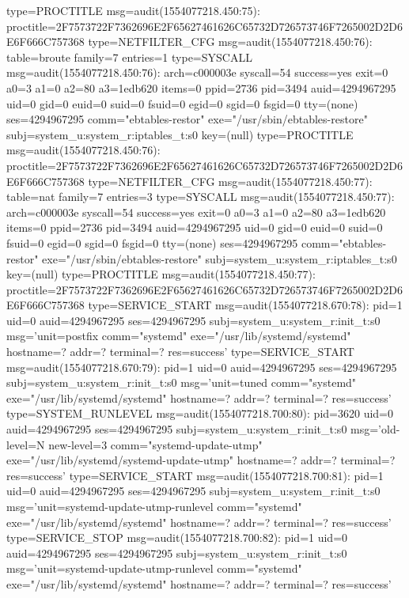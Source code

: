 \documentclass[]{report}
\newenvironment{Shaded}{}{}
\newcommand{\NormalTok}[1]{#1}
\begin{document}
\begin{Shaded}
\begin{Highlighting}[]
\NormalTok{type=PROCTITLE msg=audit(1554077218.450:75): proctitle=2F7573722F7362696E2F65627461626C65732D726573746F7265002D2D6E6F666C757368}
\NormalTok{type=NETFILTER_CFG msg=audit(1554077218.450:76): table=broute family=7 entries=1}
\NormalTok{type=SYSCALL msg=audit(1554077218.450:76): arch=c000003e syscall=54 success=yes exit=0 a0=3 a1=0 a2=80 a3=1edb620 items=0 ppid=2736 pid=3494 auid=4294967295 uid=0 gid=0 euid=0 suid=0 fsuid=0 egid=0 sgid=0 fsgid=0 tty=(none) ses=4294967295 comm="ebtables-restor" exe="/usr/sbin/ebtables-restore" subj=system_u:system_r:iptables_t:s0 key=(null)}
\NormalTok{type=PROCTITLE msg=audit(1554077218.450:76): proctitle=2F7573722F7362696E2F65627461626C65732D726573746F7265002D2D6E6F666C757368}
\NormalTok{type=NETFILTER_CFG msg=audit(1554077218.450:77): table=nat family=7 entries=3}
\NormalTok{type=SYSCALL msg=audit(1554077218.450:77): arch=c000003e syscall=54 success=yes exit=0 a0=3 a1=0 a2=80 a3=1edb620 items=0 ppid=2736 pid=3494 auid=4294967295 uid=0 gid=0 euid=0 suid=0 fsuid=0 egid=0 sgid=0 fsgid=0 tty=(none) ses=4294967295 comm="ebtables-restor" exe="/usr/sbin/ebtables-restore" subj=system_u:system_r:iptables_t:s0 key=(null)}
\NormalTok{type=PROCTITLE msg=audit(1554077218.450:77): proctitle=2F7573722F7362696E2F65627461626C65732D726573746F7265002D2D6E6F666C757368}
\NormalTok{type=SERVICE_START msg=audit(1554077218.670:78): pid=1 uid=0 auid=4294967295 ses=4294967295 subj=system_u:system_r:init_t:s0 msg='unit=postfix comm="systemd" exe="/usr/lib/systemd/systemd" hostname=? addr=? terminal=? res=success'}
\NormalTok{type=SERVICE_START msg=audit(1554077218.670:79): pid=1 uid=0 auid=4294967295 ses=4294967295 subj=system_u:system_r:init_t:s0 msg='unit=tuned comm="systemd" exe="/usr/lib/systemd/systemd" hostname=? addr=? terminal=? res=success'}
\NormalTok{type=SYSTEM_RUNLEVEL msg=audit(1554077218.700:80): pid=3620 uid=0 auid=4294967295 ses=4294967295 subj=system_u:system_r:init_t:s0 msg='old-level=N new-level=3 comm="systemd-update-utmp" exe="/usr/lib/systemd/systemd-update-utmp" hostname=? addr=? terminal=? res=success'}
\NormalTok{type=SERVICE_START msg=audit(1554077218.700:81): pid=1 uid=0 auid=4294967295 ses=4294967295 subj=system_u:system_r:init_t:s0 msg='unit=systemd-update-utmp-runlevel comm="systemd" exe="/usr/lib/systemd/systemd" hostname=? addr=? terminal=? res=success'}
\NormalTok{type=SERVICE_STOP msg=audit(1554077218.700:82): pid=1 uid=0 auid=4294967295 ses=4294967295 subj=system_u:system_r:init_t:s0 msg='unit=systemd-update-utmp-runlevel comm="systemd" exe="/usr/lib/systemd/systemd" hostname=? addr=? terminal=? res=success'}

\end{Highlighting}
\end{Shaded}
\end{document}
